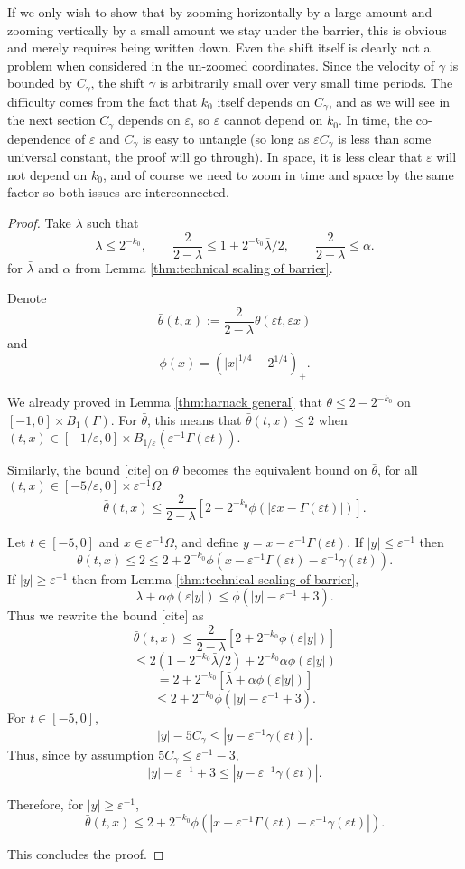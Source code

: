 \documentclass[11pt]{amsart}
\theoremstyle{remark}
\theoremstyle{definition}
\newcommand{\eps}{\varepsilon}
\newcommand{\paren}[1]{\left( #1 \right)}
\newcommand{\bracket}[1]{\left[ #1 \right]}
\newcommand{\n}{^{-1}}
\begin{document}
If we only wish to show that by zooming horizontally by a large amount and zooming vertically by a small amount we stay under the barrier, this is obvious and merely requires being written down.  Even the shift itself is clearly not a problem when considered in the un-zoomed coordinates.  Since the velocity of $\gamma$ is bounded by $C_\gamma$, the shift $\gamma$ is arbitrarily small over very small time periods.  The difficulty comes from the fact that $k_0$ itself depends on $C_\gamma$, and as we will see in the next section $C_\gamma$ depends on $\eps$, so $\eps$ cannot depend on $k_0$.  In time, the co-dependence of $\eps$ and $C_\gamma$ is easy to untangle (so long as $\eps C_\gamma$ is less than some universal constant, the proof will go through).  In space, it is less clear that $\eps$ will not depend on $k_0$, and of course we need to zoom in time and space by the same factor so both issues are interconnected.  

\begin{proof}
Take $\lambda$ such that
\[ \lambda \leq 2^{-k_0}, \qquad \frac{2}{2-\lambda} \leq 1 + 2^{-k_0} \bar{\lambda} / 2, \qquad \frac{2}{2-\lambda} \leq \alpha. \]
for $\bar{\lambda}$ and $\alpha$ from Lemma \ref{thm:technical scaling of barrier}.  

Denote 
\[ \bar{\theta}(t,x) := \frac{2}{2-\lambda} \theta(\eps t, \eps x) \]
and
\[ \phi(x) = \paren{|x|^{1/4} - 2^{1/4}}_+. \]

We already proved in Lemma \ref{thm:harnack general} that $\theta \leq 2 - 2^{-k_0}$ on $[-1,0] \times B_1(\Gamma)$.  For $\bar{\theta}$, this means that $\bar{\theta}(t,x) \leq 2$ when $(t,x) \in [-1/\eps, 0] \times B_{1/\eps}(\eps\n \Gamma(\eps t))$.  

Similarly, the bound [cite] on $\theta$ becomes the equivalent bound on $\bar{\theta}$, for all $(t,x) \in [-5/\eps,0] \times \eps\n \Omega$
\[ \bar{\theta}(t,x) \leq \frac{2}{2-\lambda} \bracket{2 + 2^{-k_0} \phi(|\eps x - \Gamma(\eps t)|)}. \]

Let $t \in [-5,0]$ and $x \in \eps\n \Omega$, and define $y = x - \eps\n \Gamma(\eps t)$.  If $|y| \leq \eps\n$ then
\[ \bar{\theta}(t,x) \leq 2 \leq 2 + 2^{-k_0} \phi(x - \eps\n \Gamma(\eps t) - \eps\n \gamma(\eps t)). \]
If $|y| \geq \eps\n$ then from Lemma \ref{thm:technical scaling of barrier}, 
\[ \bar{\lambda} + \alpha \phi(\eps |y|) \leq \phi(|y| - \eps\n + 3). \]
Thus we rewrite the bound [cite] as
\[ \bar{\theta}(t,x) \leq \frac{2}{2-\lambda} \bracket{2 + 2^{-k_0} \phi(\eps |y|)} \]
\[ \leq 2(1 + 2^{-k_0} \bar{\lambda}/2) + 2^{-k_0} \alpha \phi(\eps |y|) \]
\[ = 2 + 2^{-k_0} \bracket{\bar{\lambda} + \alpha \phi(\eps |y|)} \]
\[ \leq 2 + 2^{-k_0} \phi(|y| - \eps\n + 3). \]
For $t \in [-5,0]$,
\[ |y| - 5 C_\gamma \leq |y - \eps\n\gamma(\eps t)|. \]
Thus, since by assumption $5 C_\gamma \leq \eps\n - 3$,
\[ |y| - \eps\n + 3 \leq |y-\eps\n\gamma(\eps t)|. \]

Therefore, for $|y| \geq \eps\n$,
\[ \bar{\theta}(t,x) \leq 2 + 2^{-k_0} \phi(|x - \eps\n\Gamma(\eps t) - \eps\n\gamma(\eps t)|). \]

This concludes the proof.  
\end{proof}
\end{document}
